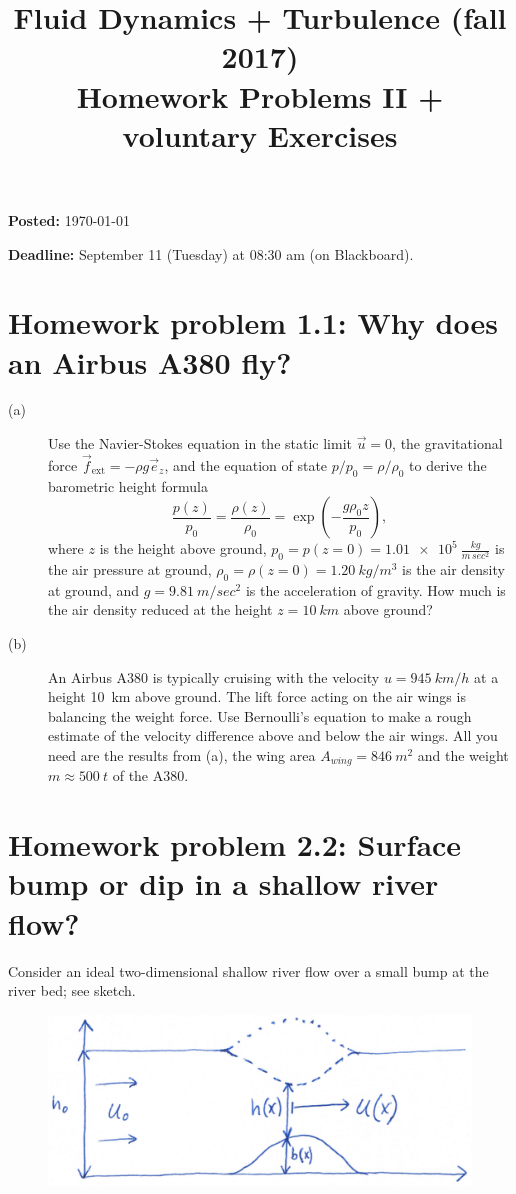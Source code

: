 \documentclass[a4paper, 10pt]{article}
\title{Fluid Dynamics + Turbulence (fall 2017)\\Homework Problems II + voluntary Exercises}
\author{}
\date{}
\begin{document}
\maketitle

\large{
\textbf{Posted:}
\today

\bigskip
\textbf{Deadline:}
September 11 (Tuesday) at 08:30 am (on Blackboard).
}

\bigskip

\section*{Homework problem 1.1: Why does an Airbus A380 fly?}
\begin{description}
\item[(a)]
Use the Navier-Stokes equation in the static limit $\vec{u}=0$, the gravitational force $\vec{f}_\mathrm{ext} = -\rho g \vec{e}_z$,  and the equation of state $p/p_0=\rho/\rho_0$ to derive the barometric height formula
\begin{equation*}
    \frac{p(z)}{p_0} = \frac{\rho(z)}{\rho_0} = \exp \left(-\frac{g\rho_0 z}{p_0}\right),
\end{equation*}
where $z$ is the height above ground, $p_0=p(z=0)=\SI{1.01e5}{\frac{kg}{m\, sec^2}}$ is the air pressure at ground, $\rho_0=\rho(z=0)=\SI{1.20}{kg/m^3}$ is the air density at ground, and $g=\SI{9.81}{m/sec^2}$ is the acceleration of gravity. How much is the air density reduced at the height $z=\SI{10}{km}$ above ground?

\item[(b)]
An Airbus A380 is typically cruising with the velocity $u=\SI{945}{km/h}$ at a height \SI{10}{km} above ground. The lift force acting on the air wings is balancing the weight force. Use Bernoulli's equation to make a rough estimate of the velocity difference above and below the air wings. All you need are the results from (a), the wing area $A_{wing} = \SI{846}{m^2}$ and the weight $m \approx \SI{500}{t}$ of the A380.
\end{description}

\newpage
\section*{Homework problem 2.2: Surface bump or dip in a shallow river flow?} 
Consider an ideal two-dimensional shallow river flow over a small bump at the river bed; see sketch.
\begin{figure}[h!]
	\centering
	\includegraphics[width=.7\textwidth]{bump.png}
\end{figure}
\end{document}
